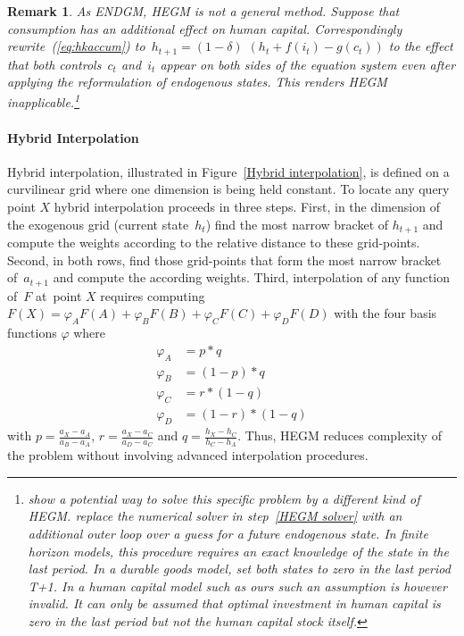 \documentclass[a4paper,12pt]{article}%
\newtheorem{remark}[theorem]{Remark}
\begin{document}
\begin{remark}
\label{rem:failurehegm} As ENDGM, HEGM is not a general method. Suppose that
consumption has an additional effect on human capital. Correspondingly
rewrite~(\ref{eq:hkaccum}) to~$h_{t+1}=\left(  1-\delta\right)  $ $\left(
h_{t}+f(i_{t})-g\left(  c_{t}\right)  \right)  $ to the effect that both
controls~$c_{t}$ and~$i_{t}$ appear on both sides of the equation system even
after applying the reformulation of endogenous states. This renders HEGM
inapplicable.\footnote{%
show a potential way to solve this specific problem by a different kind of
HEGM.
replace the numerical solver in step~\ref{HEGM solver} with an additional
outer loop over a guess for a future endogenous state. In finite horizon
models, this procedure requires an exact knowledge of the state in the last
period. In a durable goods model,
set both states to zero in the last period T+1. In a human capital model such
as ours such an assumption is however invalid. It can only be assumed that
optimal investment in human capital is zero in the last period but not the
human capital stock itself.}
\end{remark}

\paragraph{Hybrid Interpolation}

Hybrid interpolation, illustrated in Figure~\ref{Hybrid interpolation}, is
defined on a curvilinear grid where one dimension is being held constant. To
locate any query point $X$ hybrid interpolation proceeds in three steps.
First, in the dimension of the exogenous grid (current state~$h_{t}$) find the
most narrow bracket of $h_{t+1}$ and compute the weights according to the
relative distance to these grid-points. Second, in both rows, find those
grid-points that form the most narrow bracket of~$a_{t+1}$ and compute the
according weights. Third, interpolation of any function of~$F$ at\ point $X$
requires computing $F\left(  X\right)  =\varphi_{A}F(A)+\varphi_{B}%
F(B)+\varphi_{C}F(C)+\varphi_{D}F(D)$ with the four basis functions $\varphi$
where
\begin{align*}
\varphi_{A}  &  =p\ast q\\
\varphi_{B}  &  =\left(  1-p\right)  \ast q\\
\varphi_{C}  &  =r\ast\left(  1-q\right) \\
\varphi_{D}  &  =\left(  1-r\right)  \ast\left(  1-q\right)
\end{align*}
with $p=\frac{a_{X}-a_{A}}{a_{B}-a_{A}}$, $r=\frac{a_{X}-a_{C}}{a_{D}-a_{C}}$
and $q=\frac{h_{X}-h_{C}}{h_{C}-h_{A}}$. Thus, HEGM reduces complexity of the
problem without involving advanced interpolation procedures.%
\end{document}
